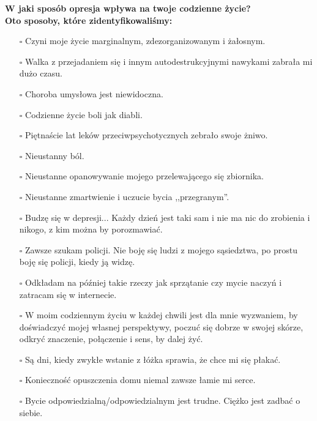 \noindent\textcolor{ProcessBlue}{\textbf{\Large{W jaki sposób opresja wpływa na twoje codzienne życie?}}}\\
\textbf{\large{Oto sposoby, które zidentyfikowaliśmy:}}
\begin{multicols}{2}
\begin{itemize}
\item[$\square$]{Czyni moje życie marginalnym, zdezorganizowanym i żałosnym.}
\item[$\square$]{Walka z przejadaniem się i innym autodestrukcyjnymi nawykami zabrała mi dużo czasu.}
\item[$\square$]{Choroba umysłowa jest niewidoczna.}
\item[$\square$]{Codzienne życie boli jak diabli.}
\item[$\square$]{Piętnaście lat leków przeciwpsychotycznych zebrało swoje żniwo.}
\item[$\square$]{Nieustanny ból.}
\item[$\square$]{Nieustanne opanowywanie mojego przelewającego się zbiornika.}
\item[$\square$]{Nieustanne zmartwienie i uczucie bycia ,,przegranym''.}
\item[$\square$]{Budzę się w depresji... Każdy dzień jest taki sam i nie ma nic do zrobienia i nikogo, z kim można by porozmawiać.}
\item[$\square$]{Zawsze szukam policji. Nie boję się ludzi z mojego sąsiedztwa, po prostu boję się policji, kiedy ją widzę.}
\item[$\square$]{Odkładam na później takie rzeczy jak sprzątanie czy mycie naczyń i zatracam się w internecie.}
\item[$\square$]{W moim codziennym życiu w każdej chwili jest dla mnie wyzwaniem, by doświadczyć mojej własnej perspektywy, poczuć się dobrze w swojej skórze, odkryć znaczenie, połączenie i sens, by dalej żyć.}
\item[$\square$]{Są dni, kiedy zwykłe wstanie z łóżka sprawia, że chce mi się płakać.}
\item[$\square$]{Konieczność opuszczenia domu niemal zawsze łamie mi serce.}
\item[$\square$]{Bycie odpowiedzialną/odpowiedzialnym jest trudne. Ciężko jest zadbać o siebie.}
\end{itemize}
\end{multicols}


